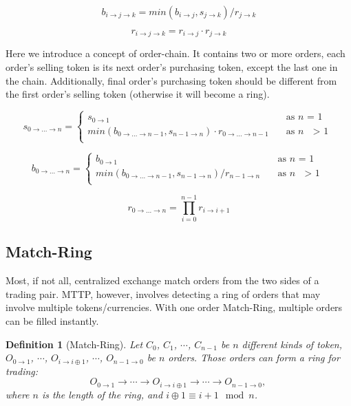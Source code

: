\documentclass[UTF8,nofonts]{article}
\newtheorem{definition}{Definition}[section]
\begin{document}
\begin{equation}
b_{i\rightarrow j\rightarrow k}=min(b_{i\rightarrow j}, s_{j\rightarrow k}) / r_{j\rightarrow k}
\end{equation}

\begin{equation}
r_{i\rightarrow j\rightarrow k}= r_{i\rightarrow j}\cdot r_{j\rightarrow k}
\end{equation}


Here we introduce a concept of order-chain. It contains two or more orders, each order's selling token is its next order's purchasing token, except the last one in the chain. Additionally,  final order's purchasing token should be different from the first order's selling token (otherwise it will become a ring).

\[ s_{0\rightarrow ...\rightarrow n} =
 \begin{cases}
  s_{0\rightarrow 1}   & \quad \text{as } n \text{ = 1}\\
  min(b_{0\rightarrow ...\rightarrow n-1}, s_{n-1\rightarrow n}) \cdot r_{0\rightarrow ...\rightarrow n-1} & \quad \text{as\ } n \text{ $>$ 1}\\
 \end{cases}
\]

\[ b_{0\rightarrow ...\rightarrow n} =
 \begin{cases}
  b_{0\rightarrow 1}   & \quad \text{as } n \text{ = 1}\\
  min(b_{0\rightarrow ...\rightarrow n-1}, s_{n-1\rightarrow n}) / r_{n-1\rightarrow n} & \quad \text{as\ } n \text{ $>$ 1}\\
 \end{cases}
\]


\[ r_{0\rightarrow ...\rightarrow n} = \prod_{i=0}^{n-1}{r_{i\rightarrow i+1}}
\]


\subsection{Match-Ring}

Most, if not all, centralized exchange match orders from the two sides of a trading pair. MTTP, however, involves detecting a ring of orders that may involve multiple tokens/currencies. With one order Match-Ring, multiple orders can be filled instantly.

\begin{definition}[Match-Ring] Let $C_{0}$, $C_{1}$, $\cdots$, $C_{n-1}$ be $n$ different kinds of token, $O_{0\rightarrow 1}$, $\cdots$, $O_{i\rightarrow i\oplus 1}$, $\cdots$, $O_{n-1 \rightarrow 0}$ be $n$ orders. Those orders can form a ring for trading:
$$O_{0\rightarrow 1} \rightarrow \cdots \rightarrow O_{i\rightarrow i\oplus 1} \rightarrow \cdots \rightarrow O_{n-1\rightarrow 0} \text{, }$$
where $n$ is the length of the ring, and $i\oplus 1 \equiv i+1 \mod n$.
\end{definition}
\end{document}

